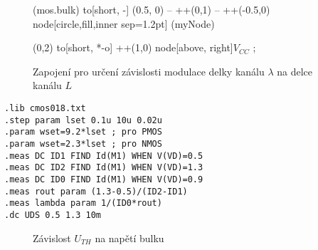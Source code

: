 \begin{figure}[H]
\begin{minipage}{0.5\textwidth}
\begin{circuitikz}[scale=1, transform shape]
                (mos.bulk) to[short, -] (0.5, 0) -- ++(0,1) -- ++(-0.5,0)  node[circle,fill,inner sep=1.2pt] (myNode) {}

                (0,2)  to[short, *-o] ++(1,0) node[above, right]{$V_{CC}$}
            ;
        \end{circuitikz}

        \vspace{5mm} 
    \end{minipage}
    \caption{\label{cod:cod_NP_WL_const} Zapojení pro určení závislosti modulace delky kanálu \(\lambda\) na delce kanálu \(L\)}
\end{figure}

\begin{lstlisting}[language=Spice, caption={ \centering Kod simulace použítí pro získání závislosti \\ modulované délky kanálu \(\lambda\) na délce kanálu \(L\)}, label={cod:cod_lambda}]
.lib cmos018.txt
.step param lset 0.1u 10u 0.02u
.param wset=9.2*lset ; pro PMOS
.param wset=2.3*lset ; pro NMOS
.meas DC ID1 FIND Id(M1) WHEN V(VD)=0.5
.meas DC ID2 FIND Id(M1) WHEN V(VD)=1.3
.meas DC ID0 FIND Id(M1) WHEN V(VD)=0.9
.meas rout param (1.3-0.5)/(ID2-ID1)
.meas lambda param 1/(ID0*rout)
.dc UDS 0.5 1.3 10m
\end{lstlisting}

\begin{figure}[H]
    \centering
    \caption{Závislost \(U_{TH}\) na napětí bulku}
    \label{fig:lambda}    
\end{figure}



